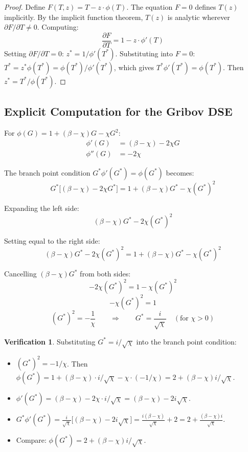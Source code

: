 \documentclass[11pt,a4paper]{article}
\theoremstyle{definition}
\newtheorem*{verification}{Verification}
\begin{document}
\begin{proof}
Define $F(T, z) = T - z \cdot \phi(T)$. The equation $F = 0$ defines $T(z)$
implicitly. By the implicit function theorem, $T(z)$ is analytic wherever
$\partial F / \partial T \neq 0$. Computing:
\[
\frac{\partial F}{\partial T} = 1 - z \cdot \phi'(T)
\]
Setting $\partial F / \partial T = 0$: $z^* = 1/\phi'(T^*)$.
Substituting into $F = 0$: $T^* = z^* \phi(T^*) = \phi(T^*)/\phi'(T^*)$,
which gives $T^* \phi'(T^*) = \phi(T^*)$.
Then $z^* = T^*/\phi(T^*)$.
\end{proof}

\subsection{Explicit Computation for the Gribov DSE}

For $\phi(G) = 1 + (\beta - \chi)G - \chi G^2$:
\begin{align}
\phi'(G) &= (\beta - \chi) - 2\chi G \\
\phi''(G) &= -2\chi
\end{align}

The branch point condition $G^* \phi'(G^*) = \phi(G^*)$ becomes:
\begin{equation}
G^* \bigl[(\beta - \chi) - 2\chi G^*\bigr] = 1 + (\beta - \chi)G^* - \chi (G^*)^2
\end{equation}

Expanding the left side:
\[
(\beta - \chi)G^* - 2\chi (G^*)^2
\]

Setting equal to the right side:
\[
(\beta - \chi)G^* - 2\chi (G^*)^2 = 1 + (\beta - \chi)G^* - \chi (G^*)^2
\]

Cancelling $(\beta - \chi)G^*$ from both sides:
\[
-2\chi (G^*)^2 = 1 - \chi (G^*)^2
\]
\[
-\chi (G^*)^2 = 1
\]
\begin{equation}
\boxed{(G^*)^2 = -\frac{1}{\chi}}
\qquad\Longrightarrow\qquad
G^* = \frac{i}{\sqrt{\chi}} \quad (\text{for } \chi > 0)
\label{eq:G_star}
\end{equation}

\begin{verification}
Substituting $G^* = i/\sqrt{\chi}$ into the branch point condition:
\begin{itemize}
\item $(G^*)^2 = -1/\chi$. Then $\phi(G^*) = 1 + (\beta{-}\chi)\cdot i/\sqrt{\chi} - \chi \cdot (-1/\chi)
     = 2 + (\beta{-}\chi) i/\sqrt{\chi}$.
\item $\phi'(G^*) = (\beta - \chi) - 2\chi \cdot i/\sqrt{\chi}
     = (\beta - \chi) - 2i\sqrt{\chi}$.
\item $G^* \phi'(G^*) = \frac{i}{\sqrt{\chi}} \bigl[(\beta - \chi) - 2i\sqrt{\chi}\bigr]
     = \frac{i(\beta{-}\chi)}{\sqrt{\chi}} + 2 = 2 + \frac{(\beta{-}\chi)i}{\sqrt{\chi}}$.
\item Compare: $\phi(G^*) = 2 + (\beta{-}\chi)i/\sqrt{\chi}$. \checkmark
\end{itemize}
\end{verification}
\end{document}
